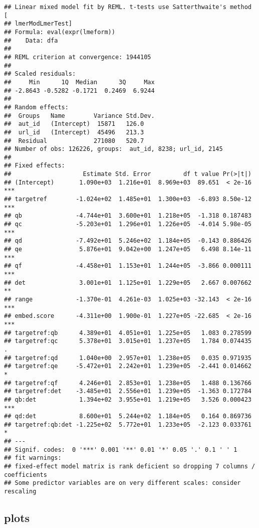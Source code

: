\documentclass[
  12pt,
  oneside]{book}
\begin{document}
\begin{verbatim}
## Linear mixed model fit by REML. t-tests use Satterthwaite's method [
## lmerModLmerTest]
## Formula: eval(expr(lmeform))
##    Data: dfa
## 
## REML criterion at convergence: 1944105
## 
## Scaled residuals: 
##     Min      1Q  Median      3Q     Max 
## -2.8643 -0.5282 -0.1721  0.2469  6.9244 
## 
## Random effects:
##  Groups   Name        Variance Std.Dev.
##  aut_id   (Intercept)  15871   126.0   
##  url_id   (Intercept)  45496   213.3   
##  Residual             271080   520.7   
## Number of obs: 126226, groups:  aut_id, 8238; url_id, 2145
## 
## Fixed effects:
##                    Estimate Std. Error         df t value Pr(>|t|)    
## (Intercept)       1.090e+03  1.216e+01  8.969e+03  89.651  < 2e-16 ***
## targetref        -1.024e+02  1.485e+01  1.300e+03  -6.893 8.50e-12 ***
## qb               -4.744e+01  3.600e+01  1.218e+05  -1.318 0.187483    
## qc               -5.203e+01  1.296e+01  1.226e+05  -4.014 5.98e-05 ***
## qd               -7.492e+01  5.246e+02  1.184e+05  -0.143 0.886426    
## qe                5.876e+01  9.042e+00  1.247e+05   6.498 8.14e-11 ***
## qf               -4.458e+01  1.153e+01  1.244e+05  -3.866 0.000111 ***
## det               3.001e+01  1.125e+01  1.229e+05   2.667 0.007662 ** 
## range            -1.370e-01  4.261e-03  1.025e+03 -32.143  < 2e-16 ***
## embed.score      -4.311e+00  1.900e-01  1.227e+05 -22.685  < 2e-16 ***
## targetref:qb      4.389e+01  4.051e+01  1.225e+05   1.083 0.278599    
## targetref:qc      5.378e+01  3.015e+01  1.237e+05   1.784 0.074435 .  
## targetref:qd      1.040e+00  2.957e+01  1.238e+05   0.035 0.971935    
## targetref:qe     -5.472e+01  2.242e+01  1.239e+05  -2.441 0.014662 *  
## targetref:qf      4.246e+01  2.853e+01  1.238e+05   1.488 0.136766    
## targetref:det    -3.485e+01  2.556e+01  1.239e+05  -1.363 0.172784    
## qb:det            1.394e+02  3.955e+01  1.219e+05   3.526 0.000423 ***
## qd:det            8.600e+01  5.244e+02  1.184e+05   0.164 0.869736    
## targetref:qb:det -1.225e+02  5.772e+01  1.233e+05  -2.123 0.033761 *  
## ---
## Signif. codes:  0 '***' 0.001 '**' 0.01 '*' 0.05 '.' 0.1 ' ' 1
## fit warnings:
## fixed-effect model matrix is rank deficient so dropping 7 columns / coefficients
## Some predictor variables are on very different scales: consider rescaling
\end{verbatim}

\subsection{plots}\label{plots-3}
\end{document}
